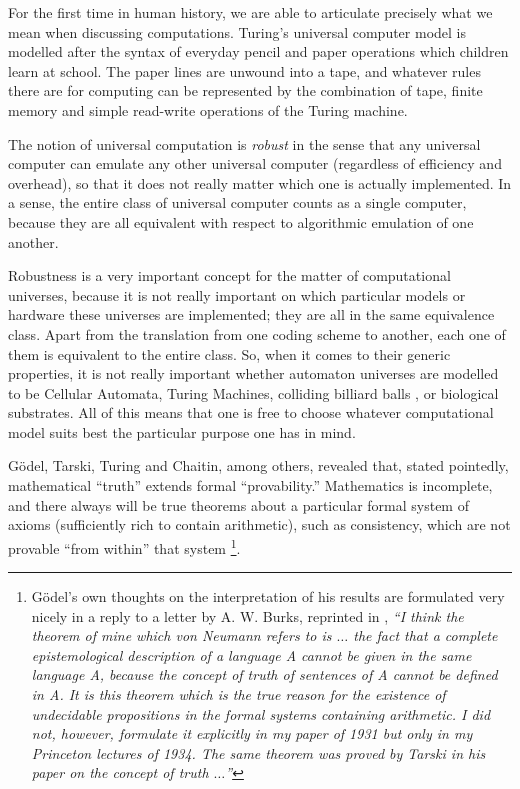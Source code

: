 \documentclass[pre,preprint,showpacs,showkeys,amsfonts]{revtex4}
\begin{document}
For the first time in human history,
we are able to articulate precisely what we mean when
discussing computations.
Turing's universal computer model is modelled after the syntax of
everyday pencil and paper operations which children learn at school.
The paper lines are unwound into a tape, and whatever rules there are for computing
can be represented by the combination of tape, finite memory and simple read-write operations
of the Turing machine.

The notion of universal computation is {\it robust}
in the sense that any universal computer can emulate
any other universal computer
(regardless of efficiency and overhead),
so that it does not really matter which one is
actually implemented.
In a sense, the entire class  of universal computer
 counts as a single computer,
because they are all equivalent with
respect to algorithmic emulation of one another.




Robustness is a very important concept for the matter of computational universes, because
it is not really important on which particular models or
hardware these universes are implemented; they are all in the same equivalence class.
Apart from the translation from one coding scheme to another,
each one of them is equivalent to the entire class.
So, when it comes to their generic properties, it is not really important
whether automaton universes are modelled to be Cellular Automata,
Turing Machines, colliding billiard balls \cite{fred-tof-82},
or biological substrates.
All of this  means that one is free to choose whatever
computational model suits best the particular purpose one has in mind.

G\"odel, Tarski, Turing and Chaitin, among others, revealed that,
stated pointedly, mathematical ``truth'' extends formal ``provability.''
Mathematics is incomplete, and
there always will be
true theorems about a particular formal system of axioms
(sufficiently rich to contain arithmetic), such as consistency,
which are not provable ``from within'' that system
\footnote{
G\"odel's own thoughts on the interpretation of his results are formulated very nicely in a
reply to a letter by A. W. Burks,
reprinted in \cite[p. 55]{v-neumann-66},
{\it ``I think the theorem of mine which von Neumann refers
to is $\ldots$ the fact that a complete epistemological description of a
language A cannot be given in the same language A,
because the concept of truth of sentences of A cannot be defined in A.
It is this theorem which is the true reason for the existence of
undecidable propositions in the formal systems containing arithmetic.
I did not, however, formulate it explicitly in my paper of 1931
but only in my Princeton lectures of 1934.
The same theorem was proved by Tarski in his paper on the concept of truth
$\ldots$''}
}.
\end{document}
